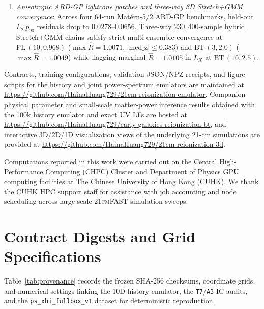 \documentclass[aps,prd,reprint,superscriptaddress,nofootinbib,amsmath,amssymb,floatfix,longbibliography]{revtex4-2}
\begin{document}
\begin{enumerate}
\item \emph{Anisotropic ARD-GP lightcone patches and three-way 8D Stretch+GMM convergence}: Across four 64-run Mat\'ern-5/2 ARD-GP benchmarks, held-out $L_2\ p_{90}$ residuals drop to $0.0278\text{--}0.0656$. Three-way $230{,}400$-sample hybrid Stretch+GMM chains satisfy strict multi-ensemble convergence at $\mathrm{PL}\,(10,0.968)$ ($\max\widehat{R}=1.0071$, $|\mathrm{med\_z}|\le 0.383$) and $\mathrm{BT}\,(3,2.0)$ ($\max\widehat{R}=1.0049$) while flagging marginal $\widehat{R}=1.0105$ in $L_X$ at $\mathrm{BT}\,(10,2.5)$.
\end{enumerate}

Contracts, training configurations, validation JSON/NPZ receipts, and figure scripts for the history and joint power-spectrum emulators are maintained at \url{https://github.com/HainaHuang729/21cm-reionization-emulator}. Companion physical parameter and small-scale matter-power inference results obtained with the 100k history emulator and exact UV LFs are hosted at \url{https://github.com/HainaHuang729/early-galaxies-reionization-bt}, and interactive 3D/2D/1D visualization views of the underlying 21-cm simulations are provided at \url{https://github.com/HainaHuang729/21cm-reionization-3d}.

\begin{acknowledgments}
Computations reported in this work were carried out on the Central High-Performance Computing (CHPC) Cluster and Department of Physics GPU computing facilities at The Chinese University of Hong Kong (CUHK). We thank the CUHK HPC support staff for assistance with job accounting and node scheduling across large-scale \textsc{21cmFAST} simulation sweeps.
\end{acknowledgments}

\appendix

\section{Contract Digests and Grid Specifications}\label{app:provenance}

Table~\ref{tab:provenance} records the frozen SHA-256 checksums, coordinate grids, and numerical settings linking the 10D history emulator, the \texttt{T7}/\texttt{A3} IC audits, and the \texttt{ps\_xhi\_fullbox\_v1} dataset for deterministic reproduction.
\end{document}
